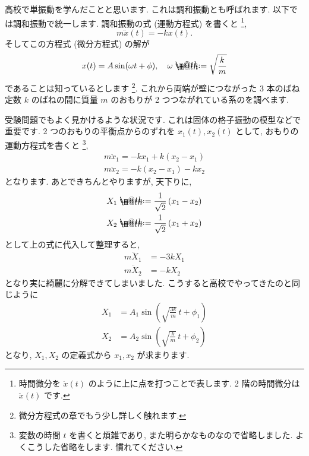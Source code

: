 \documentclass[openany, a4paper, oneside]{book}
\makeatletter
\newcommand*{\defeq}{\mathrel{\rlap{%
\raisebox{0.3ex}{$\m@th\cdot$}}%
\raisebox{-0.3ex}{$\m@th\cdot$}}%
=}
\theoremstyle{break}
\theoremstyle{breakdefn}
\makeatother
\begin{document}
高校で単振動を学んだことと思います.
これは調和振動とも呼ばれます.
以下では調和振動で統一します.
調和振動の式 (運動方程式) を書くと \footnote{時間微分を  $\dot{x}(t)$ のように上に点を打つことで表します.
2 階の時間微分は  $\ddot{x}(t)$ です.
 },
\begin{equation}
m\ddot{x}(t) = -kx (t).
\end{equation}
そしてこの方程式 (微分方程式) の解が
\begin{equation}
x (t) = A \sin (\omega t + \phi ), \quad \omega \defeq \sqrt{ \frac{k}{m} }
\end{equation}
であることは知っているとします \footnote{微分方程式の章でもう少し詳しく触れます.
 }.
これから両端が壁につながった 3 本のばね定数 $k$ のばねの間に質量 $m$ のおもりが 2 つつながれている系のを調べます.

受験問題でもよく見かけるような状況です. これは固体の格子振動の模型などで重要です.
2 つのおもりの平衡点からのずれを $x_{1}(t),x_{2}(t)$ として, おもりの運動方程式を書くと \footnote{変数の時間 $t$ を書くと煩雑であり, また明らかなものなので省略しました.
よくこうした省略をします.
慣れてください.
 },
\begin{align}
m\ddot{x}_{1} = -kx_{1} + k (x_{2} - x_{1}) \\
m\ddot{x}_{2} = - k (x_{2} - x_{1}) - kx_{2}
\end{align}
となります. あとできちんとやりますが, 天下りに,
\begin{align}
X_{1} \defeq \frac{1}{\sqrt{2}}\left ( x_{1} - x_{2} \right) \\
X_{2} \defeq \frac{1}{\sqrt{2}}\left ( x_{1} + x_{2} \right)
\end{align}
として上の式に代入して整理すると,
    \begin{align}
        m\ddot{X}_{1} &= - 3kX_{1} \\
        m\ddot{X}_{2} &= -kX_{2}
    \end{align}
となり実に綺麗に分解できてしまいました.
こうすると高校でやってきたのと同じように
    \begin{align}
        X_1 &= A_1 \sin \left ( \sqrt{\frac{ 3k }{m}} \, t + \phi _1 \right) \\
        X_2 &= A_2 \sin \left ( \sqrt{\frac{ k }{m}} \, t + \phi _2 \right)
    \end{align}
となり,  $X_1, X_2$ の定義式から $x_1,x_2$ が求まります.
\end{document}
